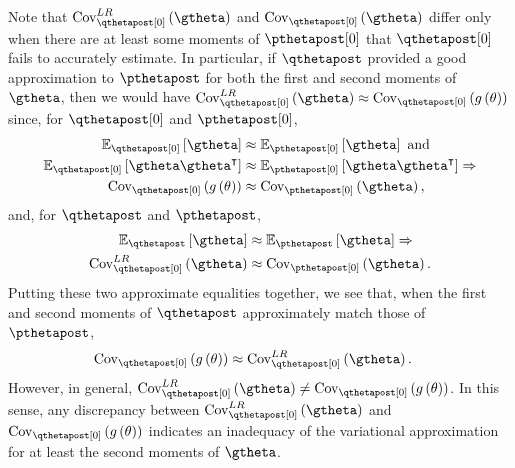 \documentclass{article}\usepackage[]{graphicx}\usepackage[]{color}
\theoremstyle{definition}
\theoremstyle{plain}
\theoremstyle{plain}
\theoremstyle{plain}
\theoremstyle{definition}
\theoremstyle{plain}
\theoremstyle{plain}
\begin{document}
Note that $\lrvbcov\left(\gtheta\right)$ and $\qcov\left(\gtheta\right)$
differ only when there are at least some moments of $\pthetapost[0]$
that $\qthetapost[0]$ fails to accurately estimate. In particular,
if $\qthetapost$ provided a good approximation to $\pthetapost$
for both the first and second moments of $\gtheta$, then we would
have $\lrvbcov\left(\gtheta\right)\approx\qcov\left(g\left(\theta\right)\right)$
since, for $\qzeropost$ and $\pzeropost$,
\begin{align*}
\mbe_{\qzeropost}\left[\gtheta\right] &\approx \mbe_{\pzeropost}\left[\gtheta\right]\textrm{ and }\\
\mbe_{\qzeropost}\left[\gtheta\gtheta^{\trans}\right] &\approx \mbe_{\pzeropost}\left[\gtheta\gtheta^{\trans}\right]\Rightarrow\\
\qcov\left(g\left(\theta\right)\right) &\approx \pcov\left(\gtheta\right),
\end{align*}
and, for $\qthetapost$ and $\pthetapost$,
\begin{align*}
\mbeq\left[\gtheta\right]& \approx\epgtheta \Rightarrow\\
\lrvbcov\left(\gtheta\right) & \approx\pcov\left(\gtheta\right).
\end{align*}
Putting these two approximate equalities together, we see that, when the first and second moments
of $\qthetapost$ approximately match those of $\pthetapost$,
\begin{align*}
\qcov\left(g\left(\theta\right)\right) & \approx\lrvbcov\left(\gtheta\right).
\end{align*}
However, in general, $\lrvbcov\left(\gtheta\right)\ne\qcov\left(g\left(\theta\right)\right)$.
In this sense, any discrepancy between $\lrvbcov\left(\gtheta\right)$
and $\qcov\left(g\left(\theta\right)\right)$ indicates an inadequacy
of the variational approximation for at least the second moments of
$\gtheta$.
\end{document}
